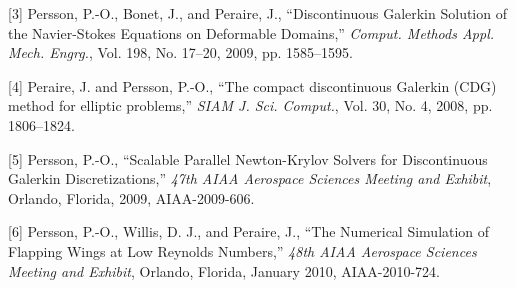 [3] Persson, P.-O., Bonet, J., and Peraire, J., ``Discontinuous
Galerkin Solution of the Navier-Stokes Equations on Deformable
Domains,'' \emph{Comput. Methods Appl. Mech. Engrg.}, Vol. 198, No.
17--20, 2009, pp. 1585--1595. \\ \vspace{-9mm}

[4] Peraire, J. and Persson, P.-O., ``The compact discontinuous
Galerkin (CDG) method for elliptic problems,'' \emph{SIAM J. Sci.
  Comput.}, Vol. 30, No. 4, 2008, pp. 1806--1824. \\ \vspace{-9mm}

[5] Persson, P.-O., ``Scalable Parallel Newton-Krylov Solvers for
Discontinuous Galerkin Discretizations,'' \emph{47th AIAA Aerospace
  Sciences Meeting and Exhibit}, Orlando, Florida, 2009,
AIAA-2009-606. \\ \vspace{-9mm}

[6] Persson, P.-O., Willis, D. J., and Peraire, J., ``The Numerical
Simulation of Flapping Wings at Low Reynolds Numbers,'' \emph{48th
  AIAA Aerospace Sciences Meeting and Exhibit}, Orlando, Florida,
January 2010, AIAA-2010-724.
